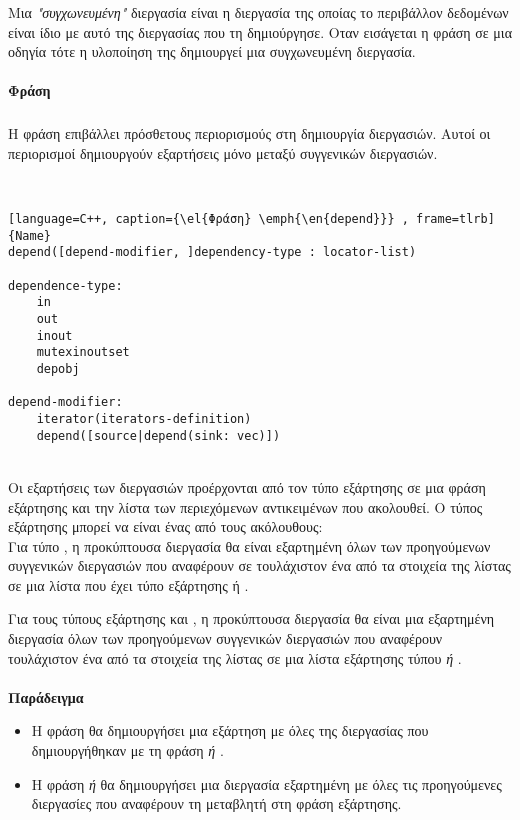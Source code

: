 Μια \emph{"συγχωνευμένη"} διεργασία είναι η διεργασία της οποίας το περιβάλλον δεδομένων είναι ίδιο με αυτό της διεργασίας που τη δημιούργησε. Οταν εισάγεται η φράση \emph{} σε μια οδηγία \emph{} τότε η υλοποίηση της δημιουργεί μια συγχωνευμένη διεργασία.
\clearpage
\paragraph{Φράση }
\subparagraph{}

Η φράση \emph{} επιβάλλει πρόσθετους περιορισμούς στη δημιουργία διεργασιών. Αυτοί οι περιορισμοί δημιουργούν εξαρτήσεις μόνο μεταξύ συγγενικών διεργασιών.

\ \\
\begin{lstlisting}[language=C++, caption={\el{Φράση} \emph{\en{depend}}} , frame=tlrb]{Name}
depend([depend-modifier, ]dependency-type : locator-list)

dependence-type:
	in
	out
	inout
	mutexinoutset
	depobj
	
depend-modifier:
	iterator(iterators-definition)
	depend([source|depend(sink: vec)])
\end{lstlisting}
\ \\
Οι εξαρτήσεις των διεργασιών προέρχονται από τον τύπο εξάρτησης σε μια φράση εξάρτησης και την λίστα των περιεχόμενων αντικειμένων που ακολουθεί. Ο τύπος εξάρτησης μπορεί να είναι ένας από τους ακόλουθους\cite{oracle1}:
\ \\
Για τύπο \textbf{}, η προκύπτουσα διεργασία θα είναι εξαρτημένη όλων των προηγούμενων συγγενικών διεργασιών που αναφέρουν σε τουλάχιστον ένα από τα στοιχεία της λίστας σε μια λίστα που έχει τύπο εξάρτησης \emph{} ή \emph{}.

Για τους τύπους εξάρτησης \emph{\textbf{}} και \emph{\textbf{}}, η προκύπτουσα διεργασία θα είναι μια εξαρτημένη διεργασία όλων των προηγούμενων συγγενικών διεργασιών που αναφέρουν τουλάχιστον ένα από τα στοιχεία της λίστας σε μια λίστα εξάρτησης τύπου \emph{ ή }.
\ \\
\ \\
\textbf{Παράδειγμα}
\begin{itemize}
\item{Η φράση \emph{} θα δημιουργήσει μια εξάρτηση με όλες της διεργασίας που δημιουργήθηκαν με τη φράση \emph{ ή }}.

\item{Η φράση \emph{ ή } θα δημιουργήσει μια διεργασία εξαρτημένη με όλες τις προηγούμενες διεργασίες που αναφέρουν τη μεταβλητή \emph{} στη φράση εξάρτησης.}
\end{itemize}
\clearpage

